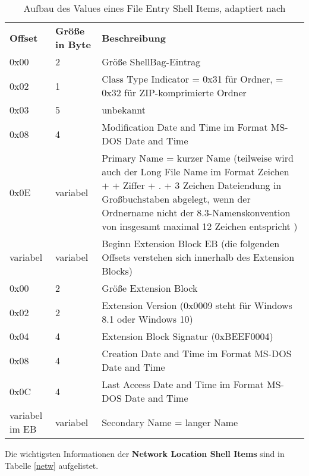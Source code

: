 \begin{longtable}{|p{}|p{}|p{}|}
	\caption{Aufbau des Values eines File Entry Shell Items, adaptiert nach \cite{shelltype}} \label{fes} \vspace{1em} \\
	\hline
	\cellcolor{gray!25}\textbf{Offset} & \cellcolor{gray!25}\textbf{Größe in Byte} & \cellcolor{gray!25}\textbf{Beschreibung} \\
	\hline
	0x00 & 2 & Größe ShellBag-Eintrag\\
	\hline
	0x02 & 1 & Class Type Indicator = 0x31 für Ordner, = 0x32 für ZIP-komprimierte Ordner \\
	\hline
	0x03 & 5 & unbekannt \\
	\hline
	0x08 & 4 & Modification Date and Time im Format MS-DOS Date and Time \\
	\hline
	0x0E & variabel & Primary Name = kurzer Name (teilweise wird auch der Long File Name im Format \glqq 6 Zeichen + \raisebox{-0.9ex}{\~{}} + Ziffer + . + 3 Zeichen Dateiendung\grqq{} in Großbuchstaben abgelegt, wenn der Ordnername nicht der 8.3-Namenskonvention von insgesamt maximal 12 Zeichen entspricht \cite[Chapter 5]{achtdrei}) \\
	\hline
	variabel & variabel & Beginn Extension Block EB (die folgenden Offsets verstehen sich innerhalb des Extension Blocks)\\
	\hline
	0x00 & 2 & Größe Extension Block \\
	\hline
	0x02 & 2 & Extension Version (0x0009 steht für Windows 8.1 oder Windows 10) \\
	\hline
	0x04 & 4 & Extension Block Signatur (0xBEEF0004) \\
	\hline
	0x08 & 4 & Creation Date and Time im Format MS-DOS Date and Time \\
	\hline
	0x0C & 4 & Last Access Date and Time im Format MS-DOS Date and Time \\
	\hline
	variabel im EB & variabel & Secondary Name = langer Name \\
	\hline
\end{longtable}
\vspace{1em}
\newpage
Die wichtigsten Informationen der \textbf{Network Location Shell Items} sind in Tabelle \ref{netw} aufgelistet.


